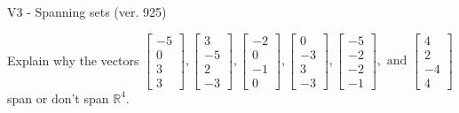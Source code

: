 \begin{exercise}
  \begin{exerciseTitle}V3 - Spanning sets (ver. 925)\end{exerciseTitle}
  \begin{exerciseStatement}
    Explain why the vectors \(\left[\begin{array}{r}
-5 \\
0 \\
3 \\
3
\end{array}\right] , \left[\begin{array}{r}
3 \\
-5 \\
2 \\
-3
\end{array}\right] , \left[\begin{array}{r}
-2 \\
0 \\
-1 \\
0
\end{array}\right] , \left[\begin{array}{r}
0 \\
-3 \\
3 \\
-3
\end{array}\right] , \left[\begin{array}{r}
-5 \\
-2 \\
-2 \\
-1
\end{array}\right] , \text{ and } \left[\begin{array}{r}
4 \\
2 \\
-4 \\
4
\end{array}\right]\) span or don't span \(\mathbb{R}^4\). 
	



\end{exerciseStatement}
\end{exercise}
